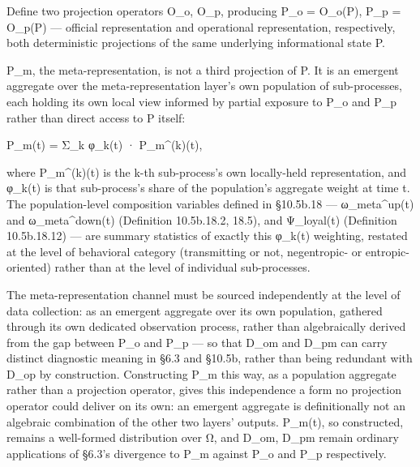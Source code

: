 \documentclass[
]{article}
\begin{document}
Define two projection operators O\_o, O\_p, producing P\_o = O\_o(P),
P\_p = O\_p(P) --- official representation and operational
representation, respectively, both deterministic projections of the same
underlying informational state P.

P\_m, the meta-representation, is not a third projection of P. It is an
emergent aggregate over the meta-representation layer's own population
of sub-processes, each holding its own local view informed by partial
exposure to P\_o and P\_p rather than direct access to P itself:

P\_m(t) = Σ\_k φ\_k(t) · P\_m\^{}(k)(t),

where P\_m\^{}(k)(t) is the k-th sub-process's own locally-held
representation, and φ\_k(t) is that sub-process's share of the
population's aggregate weight at time t. The population-level
composition variables defined in §10.5b.18 --- ω\_meta\^{}up(t) and
ω\_meta\^{}down(t) (Definition 10.5b.18.2, 18.5), and Ψ\_loyal(t)
(Definition 10.5b.18.12) --- are summary statistics of exactly this
φ\_k(t) weighting, restated at the level of behavioral category
(transmitting or not, negentropic- or entropic-oriented) rather than at
the level of individual sub-processes.

The meta-representation channel must be sourced independently at the
level of data collection: as an emergent aggregate over its own
population, gathered through its own dedicated observation process,
rather than algebraically derived from the gap between P\_o and P\_p ---
so that D\_om and D\_pm can carry distinct diagnostic meaning in §6.3
and §10.5b, rather than being redundant with D\_op by construction.
Constructing P\_m this way, as a population aggregate rather than a
projection operator, gives this independence a form no projection
operator could deliver on its own: an emergent aggregate is
definitionally not an algebraic combination of the other two layers'
outputs. P\_m(t), so constructed, remains a well-formed distribution
over Ω, and D\_om, D\_pm remain ordinary applications of §6.3's
divergence to P\_m against P\_o and P\_p respectively.
\end{document}
